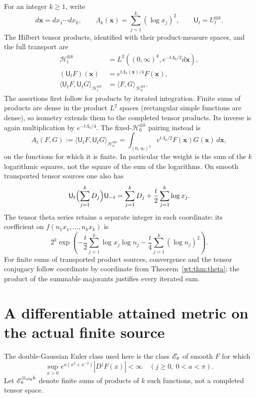 For an integer $k\geq1$, write
\[
 d\mathbf x=dx_1\cdots dx_k,\qquad
 \Lambda_k(\mathbf x)=\sum_{j=1}^k(\log x_j)^2,\qquad
 \mathsf U_t=U_t^{\otimes k}.
\]
The Hilbert tensor products, identified with their product-measure
spaces, and the full transport are
\begin{equation}\label{wt:eq:tensor}
 \begin{split}
 \mathcal H_t^{\otimes k}
 &=L^2((0,\infty)^k,e^{-t\Lambda_k/2}d\mathbf x),\\
 (\mathsf U_tF)(\mathbf x)&=e^{t\Lambda_k(\mathbf x)/4}F(\mathbf x),\\
 \langle\mathsf U_tF,\mathsf U_tG\rangle_{\mathcal H_t^{\otimes k}}
 &=\langle F,G\rangle_{\mathcal H_0^{\otimes k}}.
 \end{split}
\end{equation}
The assertions first follow for products by iterated integration.
Finite sums of products are dense in the product $L^2$ spaces
(rectangular simple functions are dense), so isometry extends
them to the completed tensor products.  Its inverse is again
multiplication by $e^{-t\Lambda_k/4}$.
The fixed-$\mathcal H_0^{\otimes k}$ pairing instead is
\begin{equation}\label{wt:eq:fixed-form}
 A_t(F,G):=\langle\mathsf U_tF,\mathsf U_tG\rangle_{\mathcal H_0^{\otimes k}}
 =\int_{(0,\infty)^k}e^{t\Lambda_k/2}\overline{F(\mathbf x)}
 G(\mathbf x)\,d\mathbf x,
\end{equation}
on the functions for which it is finite.  In particular the
weight is the sum of the $k$ logarithmic squares, not the square
of the sum of the logarithms.
On smooth transported tensor sources one also has
\[
 \mathsf U_t\Bigl(\sum_{j=1}^kD_j\Bigr)\mathsf U_{-t}
 =\sum_{j=1}^kD_j+\frac t2\sum_{j=1}^k\log x_j.
\]
The tensor theta series retains a separate integer in each
coordinate: its coefficient on $f(n_1x_1,\ldots,n_kx_k)$ is
\[
 2^k\exp\!\left(-\frac t2\sum_{j=1}^k\log x_j\log n_j
                 -\frac t4\sum_{j=1}^k(\log n_j)^2\right).
\]
For finite sums of transported product sources, convergence and
the tensor conjugacy follow coordinate by coordinate from
Theorem~\ref{wt:thm:theta}; the product of the summable majorants
justifies every iterated sum.

\section{A differentiable attained metric on the actual finite source}
\label{wt:sec:metric}

The double-Gaussian Euler class used here is the class $\mathscr E_\pi$
of smooth $F$ for which
\begin{equation}\label{wt:eq:class}
 \sup_{x>0}e^{a(x^2+x^{-2})}|D^jF(x)|<\infty
 \quad(j\geq0,\ 0<a<\pi).
\end{equation}
Let $\mathscr E_\pi^{\otimes_{\mathrm{alg}} k}$ denote finite sums of
products of $k$ such functions, not a completed tensor space.

